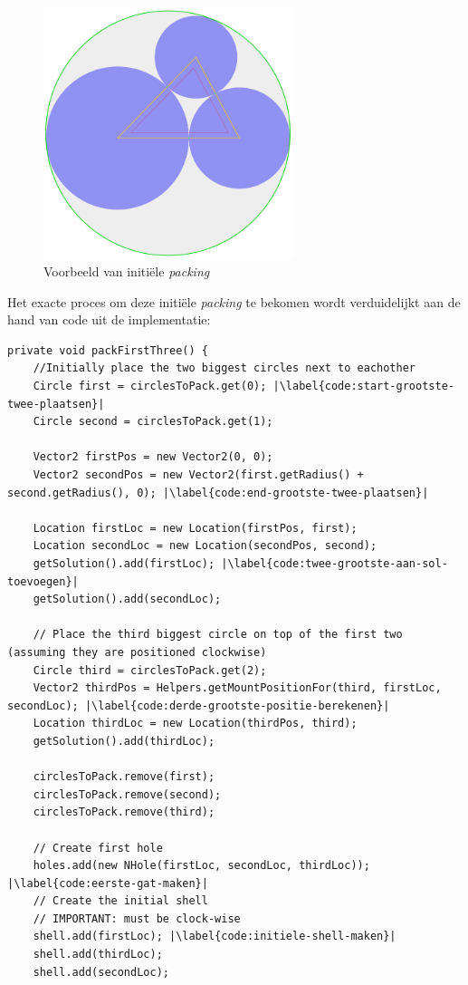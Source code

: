 \documentclass[12pt,a4paper,oneside]{book}
\begin{document}
{\begin{figure}
  \centering
  \includegraphics[width=0.65\textwidth]{initialisatie.png}
  \caption{Voorbeeld van initiële \textit{packing}} \label{fig:initialisatie} 
\end{figure}

Het exacte proces om deze initiële \textit{packing} te bekomen wordt verduidelijkt aan de hand van code uit de implementatie:

\begin{lstlisting}
private void packFirstThree() {
	//Initially place the two biggest circles next to eachother
	Circle first = circlesToPack.get(0); |\label{code:start-grootste-twee-plaatsen}|
	Circle second = circlesToPack.get(1);

	Vector2 firstPos = new Vector2(0, 0);
	Vector2 secondPos = new Vector2(first.getRadius() + second.getRadius(), 0); |\label{code:end-grootste-twee-plaatsen}|

	Location firstLoc = new Location(firstPos, first);
	Location secondLoc = new Location(secondPos, second);
	getSolution().add(firstLoc); |\label{code:twee-grootste-aan-sol-toevoegen}|
	getSolution().add(secondLoc);

	// Place the third biggest circle on top of the first two (assuming they are positioned clockwise)
	Circle third = circlesToPack.get(2);
	Vector2 thirdPos = Helpers.getMountPositionFor(third, firstLoc, secondLoc); |\label{code:derde-grootste-positie-berekenen}|
	Location thirdLoc = new Location(thirdPos, third);
	getSolution().add(thirdLoc);

	circlesToPack.remove(first);
	circlesToPack.remove(second);
	circlesToPack.remove(third);

	// Create first hole
	holes.add(new NHole(firstLoc, secondLoc, thirdLoc)); |\label{code:eerste-gat-maken}|
	// Create the initial shell
	// IMPORTANT: must be clock-wise
	shell.add(firstLoc); |\label{code:initiele-shell-maken}|
	shell.add(thirdLoc);
	shell.add(secondLoc);


\end{lstlisting}}
\end{document}
